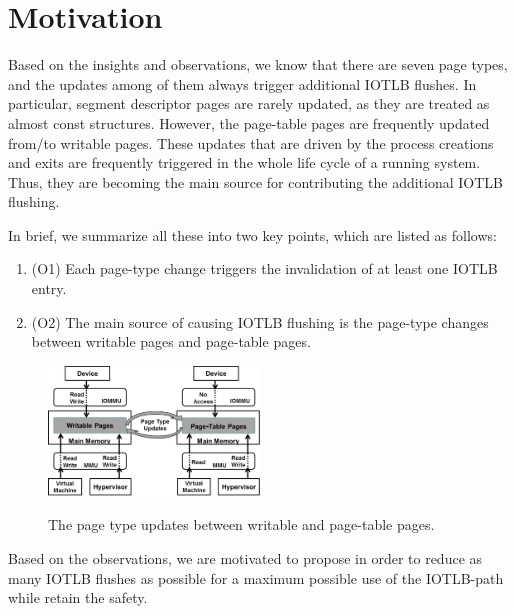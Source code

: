 \section{Motivation} \label{sec:moti}
Based on the insights and observations, we know that there are seven page types, and the updates among of them always trigger additional IOTLB flushes. 
In particular, segment descriptor pages are rarely updated, as they are treated as almost const structures.  
However, the page-table pages are frequently updated from/to writable pages. 
These updates that are driven by the process creations and exits are frequently triggered in the whole life cycle of a running system.
Thus, they are becoming the main source for contributing the additional IOTLB flushing.

In brief, we summarize all these into two key points, which are listed as follows:
\begin{enumerate}
\item (O1) Each page-type change triggers the invalidation of at least one IOTLB entry.
\item (O2) The main source of causing IOTLB flushing is the page-type changes between writable pages and page-table pages.
\end{enumerate}

\begin{figure}[ht]
\centering
\includegraphics[width=0.5\textwidth]{image/background/wr2pt.png} \\
\caption{The page type updates between writable and page-table pages.}
\label{fig:wr2pt}
\end{figure}




Based on the observations, we are motivated to propose \name in order to reduce as many IOTLB flushes as possible for a maximum possible use of the IOTLB-path while retain the safety.
